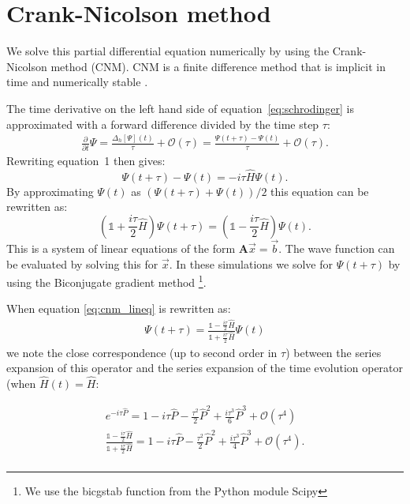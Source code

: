 \section{Crank-Nicolson method}
We solve this partial differential equation numerically by using the Crank-Nicolson method (CNM). CNM is a finite difference method that is implicit in time and numerically stable \cite{cnm}. 

The time derivative on the left hand side of equation~\ref{eq:schrodinger} is approximated with a forward difference divided by the time step $\tau$:
\begin{gather*}
    \frac{\partial}{\partial t}\Psi 
    = \frac{\Delta_h[\Psi](t)}{\tau} + \mathcal{O}(\tau)
    = \frac{\Psi(t + \tau) - \Psi(t)}{\tau} + \mathcal{O}(\tau).
\end{gather*} Rewriting equation~1 then gives:
\[
    \Psi(t+\tau)-\Psi(t) 
    = -i\tau\hat{H}\Psi(t).
\] By approximating $\Psi(t)$ as $\left(\Psi(t+\tau)+\Psi(t)\right)/2$ this equation can be rewritten as:
\begin{equation}\label{eq:cnm_lineq}
    \left(\mathbb{1}+\frac{i\tau}{2}\hat{H}\right)\Psi(t+\tau) 
    = \left(\mathbb{1}-\frac{i\tau}{2}\hat{H}\right)\Psi(t).
\end{equation} This is a system of linear equations of the form $\mathbf{A}\vec{x}=\vec{b}$. The wave function can be evaluated by solving this for $\vec{x}$. In these simulations we solve for $\Psi(t+\tau)$ by using the Biconjugate gradient method \footnote{We use the bicgstab function from the Python module Scipy}.

When equation \ref{eq:cnm_lineq} is rewritten as:
\begin{gather*}
\Psi(t+\tau) 
    = \frac{\mathbb{1}-\frac{i\tau}{2}\hat{H}}{\mathbb{1}+\frac{i\tau}{2}\hat{H}}\Psi(t)
\end{gather*} we note the close correspondence (up to second order in $\tau$) between the series expansion of this operator and the series expansion of the time evolution operator (when $\hat{H}(t) = \hat{H}$:


\begin{gather*}
e^{-i\tau\hat{P}} = 1 - i \tau\hat{P} - \frac{\tau^2}{2}\hat{P}^2 + \frac{i\tau^3}{6}\hat{P}^3 + \mathcal{O}(\tau^4)\\
\frac{\mathbb{1}-\frac{i\tau}{2}\hat{H}}{\mathbb{1}+\frac{i\tau}{2}\hat{H}} = 1 - i \tau\hat{P} - \frac{\tau^2}{2}\hat{P}^2 + \frac{i\tau^3}{4}\hat{P}^3 + \mathcal{O}(\tau^4).\\
\end{gather*}

